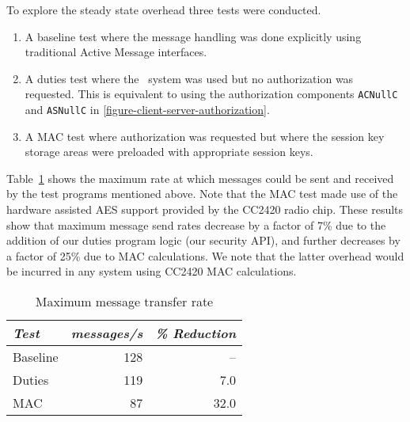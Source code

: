 To explore the steady state overhead three tests were conducted.
\begin{enumerate}
\item A baseline test where the message handling was done explicitly
  using traditional Active Message interfaces.
\item A duties test where the \Sprocket\ system was used but no
  authorization was requested. This is equivalent to using the
  authorization components \texttt{ACNullC} and \texttt{ASNullC} in
  \autoref{figure-client-server-authorization}.
\item A MAC test where authorization was requested but where the session
  key storage areas were preloaded with appropriate session keys.
\end{enumerate}

Table~\ref{table-steady-state} shows the maximum rate at which
messages could be sent and received by the test programs mentioned
above. Note that the MAC test made use of the hardware assisted AES
support provided by the CC2420 radio chip. These results show that
maximum message send rates decrease by a factor of 7\% due to the
addition of our duties program logic (our security API), and further
decreases by a factor of 25\% due to MAC calculations. We note that
the latter overhead would be incurred in any system using CC2420 MAC
calculations.

\begin{table}[!t]
  \newcommand\T{\rule{0pt}{2.1ex}}
  \centering
  \caption{Maximum message transfer rate}
  {
  \begin{tabular}{|l|r|r|} \hline
    \textit{Test} \T & \textit{messages/s} & \textit{\% Reduction} \\
    \hline \hline

    Baseline \T & 128 &   -- \\ \hline 
    Duties   \T & 119 &  7.0 \\ \hline
    MAC      \T &  87 & 32.0 \\ \hline
  \end{tabular}
  }
  \label{table-steady-state}
\end{table}

